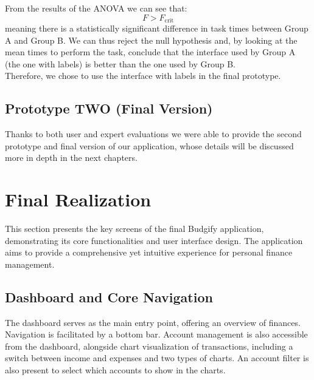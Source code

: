 \documentclass[a4paper,12pt]{article}
\begin{document}
From the results of the ANOVA we can see that:\\
\[
F > F_{\text{crit}}
\]
meaning there is a statistically significant difference in task times between Group A and Group B. We can thus reject the null hypothesis and, by looking at the mean times to perform the task, conclude that the interface used by Group A (the one with labels) is better than the one used by Group B.\\
Therefore, we chose to use the interface with labels in the final prototype.

\subsection{Prototype TWO (Final Version)}
Thanks to both user and expert evaluations we were able to provide the second prototype and final version of our application, whose details will be discussed more in depth in the next chapters.


\section{Final Realization}
\label{sec:final_realization}
This section presents the key screens of the final Budgify application, demonstrating its core functionalities and user interface design. The application aims to provide a comprehensive yet intuitive experience for personal finance management.

\subsection{Dashboard and Core Navigation}
The dashboard serves as the main entry point, offering an overview of finances. Navigation is facilitated by a bottom bar. Account management is also accessible from the dashboard, alongside chart visualization of transactions, including a switch between income and expenses and two types of charts. An account filter is also present to select which accounts to show in the charts.
\end{document}
